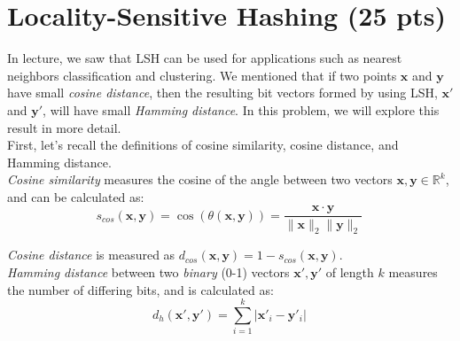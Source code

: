 \documentclass{exam}
\newcommand{\R}{\mathbb{R}} %
\newcommand{\xv}{\mathbf{x}}
\newcommand{\yv}{\mathbf{y}}
\begin{document}
\newpage
\section{Locality-Sensitive Hashing (25 pts)}

In lecture, we saw that LSH can be used for applications such as nearest neighbors classification and clustering. We mentioned that if two points $\xv$ and $\yv$ have small \textit{cosine distance}, then the resulting bit vectors formed by using LSH, $\xv'$ and $\yv'$, will have small \textit{Hamming distance}. In this problem, we will explore this result in more detail. \\

\noindent First, let's recall the definitions of cosine similarity, cosine distance, and Hamming distance.\\

\noindent \textit{Cosine similarity} measures the cosine of the angle between two vectors $\xv, \yv \in \R^k$, and can be calculated as:
$$ s_{cos}(\xv,\yv) = \cos(\theta(\xv,\yv)) =  \frac{\xv \cdot \yv}{\|\xv\|_2 \|\yv\|_2} \, $$

\noindent \textit{Cosine distance} is measured as $d_{cos}(\xv,\yv) = 1-s_{cos}(\xv,\yv).$ \\

\noindent \textit{Hamming distance} between two \textit{binary} (0-1) vectors $\xv', \yv'$ of length $k$ measures the number of differing bits, and is calculated as:
$$ d_{h} (\xv',\yv') = \sum_{i=1}^k |\xv'_i - \yv'_i| \, $$
\vspace{1em}
\end{document}
